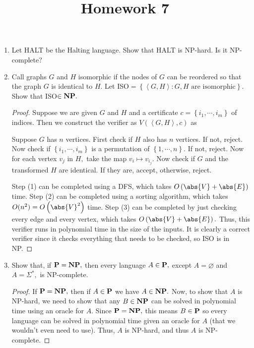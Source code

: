 \documentclass{article}
\begin{document}
\title{Homework 7}
\maketitle
\thispagestyle{fancy}

\begin{enumerate}
	\item Let HALT be the Halting language. Show that HALT is NP-hard. Is it NP-complete?

	\item Call graphs $G$ and $H$ isomorphic if the nodes of $G$ can be reordered so that the graph $G$ is identical to $H.$ Let ISO$=\left\{ \left< G, H\right>: G, H\text{ are isomorphic} \right\}.$ Show that ISO$\in \bf{NP}.$
		\begin{proof}
			Suppose we are given $G$ and $H$ and a certificate $c=\left\{ i_1, \cdots, i_m \right\}$ of indices. Then we construct the verifier as $V( \left< G, H\right>, c)$ as
			\begin{enumerate}[(1)]
				\ii Suppose $G$ has $n$ vertices. First check if $H$ also has $n$ vertices. If not, reject.
				\ii Now check if $\left\{ i_1, \cdots, i_m \right\}$ is a permutation of $\left\{ 1, \cdots, n \right\}.$ If not, reject.
				\ii Now for each vertex $v_j$ in $H,$ take the map $v_i\mapsto v_{i_j}.$ Now check if $G$ and the transformed $H$ are identical. If they are, accept, otherwise, reject.
			\end{enumerate}

			Step (1) can be completed using a DFS, which takes $O\left(\abs{V}+\abs{E}\right)$ time. Step (2) can be completed using a sorting algorithm, which takes $O(n^2)=O\left( \abs{V}^2 \right)$ time. Step (3) can be completed by just checking every edge and every vertex, which takes $O\left( \abs{V}+\abs{E} \right).$ Thus, this verifier runs in polynomial time in the size of the inputs. It is clearly a correct verifier since it checks everything that needs to be checked, so ISO is in NP.
		\end{proof}

	\item Show that, if $\bf{P}=\bf{NP},$ then every language $A\in\bf{P},$ except $A=\varnothing$ and $A=\Sigma^*,$ is NP-complete.
		\begin{proof}
			If $\bf{P}=\bf{NP},$ then if $A\in\bf{P}$ we have $A\in\bf{NP}.$ Now, to show that $A$ is NP-hard, we need to show that any $B\in\bf{NP}$ can be solved in polynomial time using an oracle for $A.$ Since $\bf{P}=\bf{NP},$ this means $B\in \bf{P}$ so every language can be solved in polynomial time given an oracle for $A$ (that we wouldn't even need to use). Thus, $A$ is NP-hard, and thus $A$ is NP-complete. 
		\end{proof}


\end{enumerate}
\end{document}
